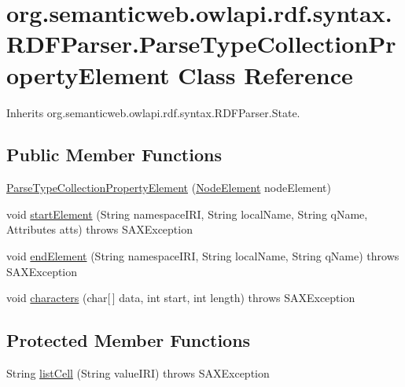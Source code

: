 \hypertarget{classorg_1_1semanticweb_1_1owlapi_1_1rdf_1_1syntax_1_1_r_d_f_parser_1_1_parse_type_collection_property_element}{\section{org.\-semanticweb.\-owlapi.\-rdf.\-syntax.\-R\-D\-F\-Parser.\-Parse\-Type\-Collection\-Property\-Element Class Reference}
\label{classorg_1_1semanticweb_1_1owlapi_1_1rdf_1_1syntax_1_1_r_d_f_parser_1_1_parse_type_collection_property_element}
}


Inherits org.\-semanticweb.\-owlapi.\-rdf.\-syntax.\-R\-D\-F\-Parser.\-State.

\subsection*{Public Member Functions}
\begin{DoxyCompactItemize}
\item 
\hyperlink{classorg_1_1semanticweb_1_1owlapi_1_1rdf_1_1syntax_1_1_r_d_f_parser_1_1_parse_type_collection_property_element_a85bce7554ed4716739f819140700e5fb}{Parse\-Type\-Collection\-Property\-Element} (\hyperlink{classorg_1_1semanticweb_1_1owlapi_1_1rdf_1_1syntax_1_1_r_d_f_parser_1_1_node_element}{Node\-Element} node\-Element)
\item 
void \hyperlink{classorg_1_1semanticweb_1_1owlapi_1_1rdf_1_1syntax_1_1_r_d_f_parser_1_1_parse_type_collection_property_element_afc019f866185984a6a9890e67a639e28}{start\-Element} (String namespace\-I\-R\-I, String local\-Name, String q\-Name, Attributes atts)  throws S\-A\-X\-Exception 
\item 
void \hyperlink{classorg_1_1semanticweb_1_1owlapi_1_1rdf_1_1syntax_1_1_r_d_f_parser_1_1_parse_type_collection_property_element_a2837343ac7da96e23a8bfc92962abc54}{end\-Element} (String namespace\-I\-R\-I, String local\-Name, String q\-Name)  throws S\-A\-X\-Exception 
\item 
void \hyperlink{classorg_1_1semanticweb_1_1owlapi_1_1rdf_1_1syntax_1_1_r_d_f_parser_1_1_parse_type_collection_property_element_aa1272087918babc592d40c58d25683f9}{characters} (char\mbox{[}$\,$\mbox{]} data, int start, int length)  throws S\-A\-X\-Exception 
\end{DoxyCompactItemize}
\subsection*{Protected Member Functions}
\begin{DoxyCompactItemize}
\item 
String \hyperlink{classorg_1_1semanticweb_1_1owlapi_1_1rdf_1_1syntax_1_1_r_d_f_parser_1_1_parse_type_collection_property_element_a4769ea8c3db816a3d797c4a1f0cf79ef}{list\-Cell} (String value\-I\-R\-I)  throws S\-A\-X\-Exception 
\end{DoxyCompactItemize}
